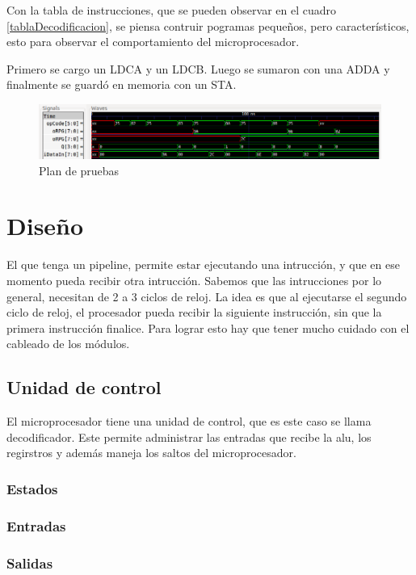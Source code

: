 \documentclass[paper=letter, fontsize=12pt]{article}
\begin{document}
Con la tabla de instrucciones, que se pueden observar en el cuadro \ref{tablaDecodificacion}, se piensa contruir pogramas pequeños, pero característicos, esto para observar el comportamiento del microprocesador.

Primero se cargo un LDCA y un LDCB. Luego se sumaron con una ADDA y finalmente se guardó en memoria con un STA.

\begin{figure}[hbtp]
\centering
\includegraphics[width=0.5\linewidth]{planPruebasUno.png}
\caption{Plan de pruebas}
\end{figure}

\section{Diseño}

El que tenga un pipeline, permite estar ejecutando una intrucción, y que en ese momento pueda recibir otra intrucción. Sabemos que las intrucciones por lo general, necesitan de 2 a 3 ciclos de reloj. La idea es que al ejecutarse el segundo ciclo de reloj, el procesador pueda recibir la siguiente instrucción, sin que la primera instrucción finalice. Para lograr esto hay que tener mucho cuidado con el cableado de los módulos.

\subsection{Unidad de control}
El microprocesador tiene una unidad de control, que es este caso se llama decodificador. Este permite administrar las entradas que recibe la alu, los regirstros y además maneja los saltos del microprocesador.

\subsubsection{Estados}



\subsubsection{Entradas}

\subsubsection{Salidas}
\end{document}
